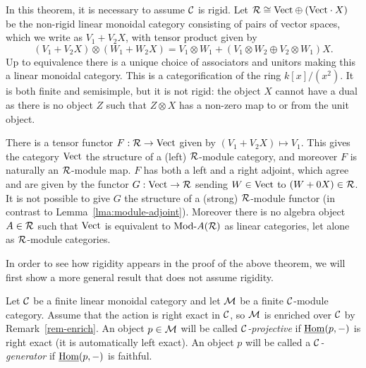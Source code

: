 \documentclass{amsart}
\begin{document}
\begin{example} \label{ex:lax-module}
	In this theorem, it is necessary to assume $\mathcal C$ is rigid.  Let $\mathcal R \cong \mathrm{Vect} \oplus (\mathrm{Vect} \cdot X)$ be the non-rigid linear monoidal category consisting of pairs of vector spaces, which we write as $V_1 + V_2 X$, with tensor product given by 
	\begin{equation*}
		(V_1 + V_2 X) \otimes (W_1 + W_2 X) = V_1 \otimes W_1  +  (V_1 \otimes W_2 \oplus V_2 \otimes W_1)X.
	\end{equation*} 
	Up to equivalence there is a unique choice of associators and unitors making this a linear monoidal category. 
This is a categorification of the ring $k[x]/(x^2)$.  It is both finite and semisimple, but it is not rigid: the object $X$ cannot have a dual as there is no object $Z$ such that $Z \otimes X$ has a non-zero map to or from the unit object. 
	
	There is a tensor functor $F:\mathcal R \to \mathrm{Vect}$ given by $(V_1 + V_2 X) \mapsto V_1$. This gives the category $\mathrm{Vect}$ the structure of a (left) $\mathcal R$-module category, and moreover $F$ is naturally an $\mathcal R$-module map. $F$ has both a left and a right adjoint, which agree and are given by the functor $G: \mathrm{Vect} \to \mathcal R$ sending $W \in \mathrm{Vect}$ to $(W + 0 X) \in \mathcal R$. %
	It is not possible to give $G$ the structure of a (strong) $\mathcal R$-module functor (in contrast to Lemma~\ref{lma:module-adjoint}). Moreover there is no algebra object $A \in \mathcal R$ such that $\mathrm{Vect}$ is equivalent to $\Mod{}{A}(\cR)$ as linear categories, let alone as $\mathcal R$-module categories. %
\end{example}

In order to see how rigidity appears in the proof of the above theorem, we will first show a more general result that does not assume rigidity.

\begin{definition}
	Let $\mathcal C$ be a finite linear monoidal category and let $\mathcal M$ be a finite $\mathcal C$-module category. Assume that the action is right exact in $\mathcal C$, so $\mathcal M$ is enriched over $\mathcal C$ by Remark~\ref{rem-enrich}. 
	An object $p \in \mathcal M$ will be called {\em $\mathcal C$-projective} if $\operatorname{\underline{Hom}}(p, -)$ is right exact (it is automatically left exact). An object $p$ will be called a {\em $\mathcal C$-generator} if $\operatorname{\underline{Hom}}(p,-)$ is faithful.
\end{definition}
\end{document}
